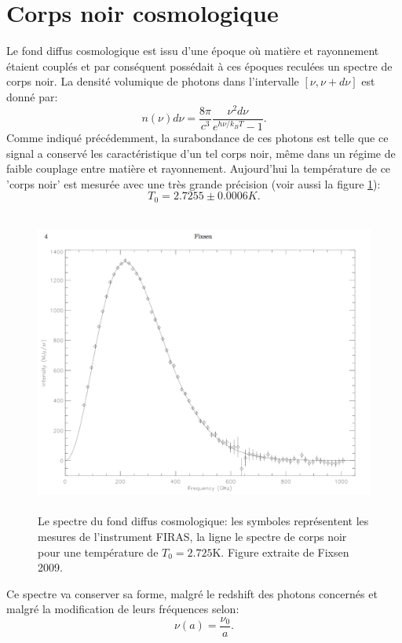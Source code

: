 \section{Corps noir cosmologique}
Le fond diffus cosmologique est issu d'une époque où matière et rayonnement étaient couplés et par conséquent possédait à ces époques reculées un spectre de corps noir. La densité volumique de photons dans l'intervalle $[\nu,\nu+d\nu]$ est donné par:
\begin{equation}
n(\nu)d\nu=\frac{8\pi}{c^3}\frac{\nu^2d\nu}{e^{h\nu/k_BT}-1}.
\end{equation}
Comme indiqué précédemment, la surabondance de ces photons est telle que ce signal a conservé les caractéristique d'un tel corps noir, même dans un régime de faible couplage entre matière et rayonnement. Aujourd'hui la température de ce 'corps noir' est mesurée avec une très grande précision (voir aussi la figure \ref{f:bb}):
\begin{equation}
T_0=2.7255\pm0.0006 K.
\end{equation}
\begin{figure}[htbp]
	\centering
		\includegraphics[height=10cm]{figs/bb.png}
		\caption{Le spectre du fond diffus cosmologique: les symboles représentent les mesures de l'instrument FIRAS, la ligne le spectre de corps noir pour une température de $T_0=2.725$K. Figure extraite de Fixsen 2009.}
	\label{f:bb}
\end{figure}
Ce spectre va conserver sa forme, malgré le redshift des photons concernés et malgré la modification de leurs fréquences selon:
\begin{equation}
\nu(a)=\frac{\nu_0}{a}.
\end{equation}
